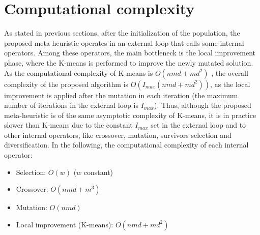 \section{Computational complexity}
\label{sec:complexity-algo}
As stated in previous sections, after the initialization of the population, the proposed meta-heuristic operates in an external loop that calls some internal operators. Among these operators, the main bottleneck is the local improvement phase, where the K-means is performed to improve the newly mutated solution. As the computational complexity of K-means is $O(nmd + md^2)$ \cite{Hamerly2010}, the overall complexity of the proposed algorithm is $O(I_{max} (nmd + md^2))$, as the local improvement is applied after the mutation in each iteration (the maximum number of iterations in the external loop is $I_{max}$). Thus, although the proposed meta-heuristic is of the same asymptotic complexity of K-means, it is in practice slower than K-means due to the constant $I_{max}$ set in the external loop and to other internal operators, like crossover, mutation, survivors selection and diversification. In the following, the computational complexity of each internal operator:



\begin{itemize}

	\item Selection: $O(w)$ ($w$ constant)

	\item Crossover: $O(nmd + m^{3})$

	\item Mutation: $O(nmd)$

	\item Local improvement (K-means): $O(nmd + md^2)$

\end{itemize}


